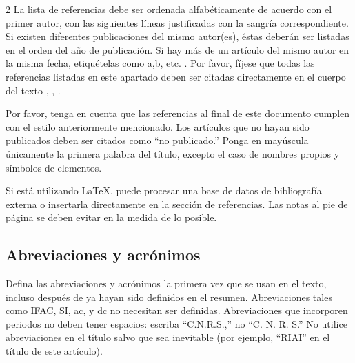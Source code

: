 \documentclass[5p,times,authoryear]{sciarticle}
\begin{document}
\begin{multicols}{2}
La lista de referencias debe ser ordenada alfabéticamente
de acuerdo con el primer autor, con las siguientes líneas justificadas con la sangría correspondiente.
Si existen diferentes publicaciones del mismo autor(es), éstas deberán ser listadas en el orden del
año de publicación. Si hay más de un artículo del mismo autor en la misma fecha,
etiquételas como a,b, etc. \citep{Bak:63a,Bak:63b}. Por favor,
fíjese que todas las referencias \citep{Garcia:2007}
listadas en este apartado \citep{Garcia:2008}
deben ser citadas directamente en el cuerpo del texto \citep{Garcia:2004}, \citep{Dog:58}, \citep{Keo:58}.

Por favor, tenga en cuenta que las referencias al final de este
documento cumplen con el estilo anteriormente mencionado. Los
artículos que no hayan sido publicados deben ser citados como ``no
publicado.'' Ponga en mayúscula únicamente la primera palabra del
título, excepto el caso de nombres propios y símbolos de elementos.

Si está utilizando LaTeX, puede procesar una base de datos de bibliografía externa o insertarla directamente en la sección de referencias.
Las notas al pie de página se deben evitar en la medida de lo posible.

\subsection{Abreviaciones y acrónimos}

Defina las abreviaciones y acrónimos la primera vez que se usan en
el texto, incluso después de ya hayan sido definidos en el resumen.
Abreviaciones tales como IFAC, SI, ac, y dc no necesitan ser
definidas. Abreviaciones que incorporen periodos no deben tener
espacios: escriba ``C.N.R.S.,'' no ``C. N. R. S.'' No utilice
abreviaciones en el título salvo que sea inevitable (por ejemplo,
``RIAI'' en el título de este artículo).



\end{multicols}
\end{document}
